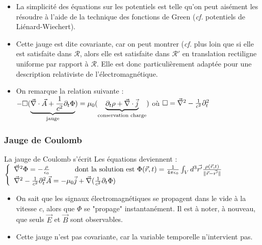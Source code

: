 	
	\begin{remarks} \hspace{1cm}
		\begin{itemize}
			\item La simplicité des équations sur les potentiels est telle qu'on peut aisément les résoudre à l'aide de la technique des fonctions de Green (\emph{cf.} potentiels de Liénard-Wiechert).
			\item Cette jauge est dite covariante, car on peut montrer (\emph{cf.} plus loin que si elle est satisfaite dans $\mathcal{R}$, alors elle est satisfaite dans $\mathcal{R}'$ en translation rectiligne uniforme par rapport à $\mathcal{R}$. Elle est donc particulièrement adaptée pour une description relativiste de l'électromagnétique.
			\item On remarque la relation suivante :\\
			 $-\square(\underbrace{\vec{\nabla}\cdot\vec{A}+\frac{1}{c^2}\partial_t\Phi}_{\text{jauge}})=\mu_0(\underbrace{\partial_t\rho+\vec{\nabla}\cdot\vec{j}}_{\text{conservation  charge}})$
			\hspace{1cm} où
			 $\square=\vec{\nabla}^2-\frac{1}{c^2}\partial_t^2$
		\end{itemize}
	\end{remarks}
	
	\subsubsection{Jauge de Coulomb}
	
	La jauge de Coulomb s'écrit 
	Les équations deviennent :\\
	\indent
	$\left\{ \begin{array}{l}
		\vec{\nabla}^2\Phi=-\frac{\rho}{\epsilon_0} \text{ \hspace{1cm} dont la solution est } \Phi(\vec{r},t)=\frac{1}{4\pi\epsilon_0}\int_Vd^3\vec{r'}\frac{\rho(\vec{r},t)}{\parallel\vec{r}-\vec{r'}\parallel}\\
		\vec{\nabla}^2-\frac{1}{c^2}\partial_t^2\vec{A}=-\mu_0\vec{j}+\vec{\nabla}(\frac{1}{c^2}\partial_t\Phi)	
	\end{array} \right.
	$
	
	\begin{remarks}
		\hspace{1pt}
		\begin{itemize}
			\item On sait que les signaux électromagnétiques se propagent dans le vide à la vitesse $c$, alors que $\Phi$ se "propage" instantanément. Il est à noter, à nouveau, que seuls $\vec{E}$ et $\vec{B}$ sont observables.
			\item Cette jauge n'est pas covariante, car la variable temporelle n'intervient pas.
		\end{itemize}
	\end{remarks}
	
